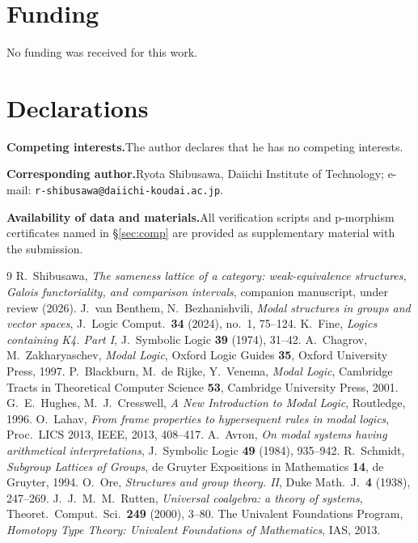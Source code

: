 \documentclass[11pt]{amsart}
\theoremstyle{definition}
\begin{document}
\section*{Funding}
No funding was received for this work.

\section*{Declarations}
\noindent\textbf{Competing interests.}\quad The author declares that he has no
competing interests.

\noindent\textbf{Corresponding author.}\quad Ryota Shibusawa, Daiichi Institute
of Technology; e-mail: \texttt{r-shibusawa@daiichi-koudai.ac.jp}.

\noindent\textbf{Availability of data and materials.}\quad All verification
scripts and p-morphism certificates named in \S\ref{sec:comp} are provided as
supplementary material with the submission.

\begin{thebibliography}{9}
 R.~Shibusawa, \emph{The sameness lattice of a category:
weak-equivalence structures, Galois functoriality, and comparison intervals},
companion manuscript, under review (2026).
 J.~van Benthem, N.~Bezhanishvili, \emph{Modal structures in
groups and vector spaces}, J.\ Logic Comput.\ \textbf{34} (2024), no.~1,
75--124.
 K.~Fine, \emph{Logics containing K4. Part I}, J.\ Symbolic
Logic \textbf{39} (1974), 31--42.
 A.~Chagrov, M.~Zakharyaschev, \emph{Modal Logic}, Oxford Logic
Guides \textbf{35}, Oxford University Press, 1997.
 P.~Blackburn, M.~de Rijke, Y.~Venema, \emph{Modal Logic},
Cambridge Tracts in Theoretical Computer Science \textbf{53}, Cambridge
University Press, 2001.
 G.~E.~Hughes, M.~J.~Cresswell, \emph{A New Introduction to Modal
Logic}, Routledge, 1996.
 O.~Lahav, \emph{From frame properties to hypersequent rules in
modal logics}, Proc.\ LICS 2013, IEEE, 2013, 408--417.
 A.~Avron, \emph{On modal systems having arithmetical
interpretations}, J.\ Symbolic Logic \textbf{49} (1984), 935--942.
 R.~Schmidt, \emph{Subgroup Lattices of Groups}, de Gruyter
Expositions in Mathematics \textbf{14}, de Gruyter, 1994.
 O.~Ore, \emph{Structures and group theory. II}, Duke Math.\ J.\
\textbf{4} (1938), 247--269.
 J.~J.~M.~M.~Rutten, \emph{Universal coalgebra: a theory of
systems}, Theoret.\ Comput.\ Sci.\ \textbf{249} (2000), 3--80.
 The Univalent Foundations Program, \emph{Homotopy Type
Theory: Univalent Foundations of Mathematics}, IAS, 2013.
\end{thebibliography}
\end{document}
